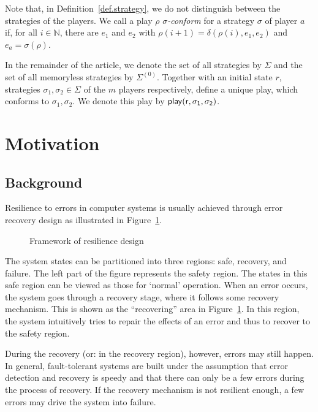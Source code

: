 \documentclass[times,10pt,twocolumn]{article}
\newcommand{\emplay}{\ensuremath{\sf play}}
\newcommand{\nnneg}{{\mathbb N}}
\begin{document}
Note that, in Definition~\ref{def.strategy}, 
we do not distinguish between the strategies of the players.
We call a play $\rho$ \emph{$\sigma$-conform} 
for a strategy $\sigma$ of player $a$ if, for all $i\in \nnneg$, 
there are $e_1$ and $e_2$ with 
$\rho(i+1)=\delta(\rho(i),e_1,e_2)$\label{reply1.ea2em} and 
$e_a=\sigma(\rho)$.

In the remainder of the article, 
we denote the set of all strategies by $\Sigma$ and 
the set of all memoryless strategies by $\Sigma^{(0)}$.   
Together with an initial state $r$,  
strategies $\sigma_1,\sigma_2 \in \Sigma$ 
of the $m$ players respectively, define a unique play, 
which conforms to $\sigma_1,\sigma_2$.
We denote this play by $\emplay(r,\sigma_1,\sigma_2)$.\label{reply1.emplay.def} 



\section{Motivation \label{sec.motiv}} 

\subsection{Background \label{subsec.rgame.bkg}} 

Resilience to errors in computer systems is\label{reply2.are.is} usually 
achieved through error recovery design as illustrated in Figure~\ref{fig.frwk}.  
\begin{figure}[t]
\begin{center}
\caption{Framework of resilience design}
\label{fig.frwk} 
\end{center}
\end{figure}  
The system states can be partitioned into three regions: 
safe, recovery, and failure. 
The left part of the figure represents the safety region.
The states in this safe region can be viewed as those for `normal' operation. 
When an error occurs, the system goes through a recovery stage, where it follows some recovery mechanism.
This is shown as the ``recovering'' area in Figure~\ref{fig.frwk}.
In this region, the system intuitively tries to repair the effects of an error and thus to recover to the safety region. 

During the recovery (or: in the recovery region), however, errors may still happen.  
In general, fault-tolerant systems are built under the assumption that error detection and recovery is speedy and that there 
can only be a few errors\label{reply2.cannnot.be2} 
during the process of recovery.
If the recovery mechanism is not resilient enough, a few errors may drive the system into failure.  
\end{document}
